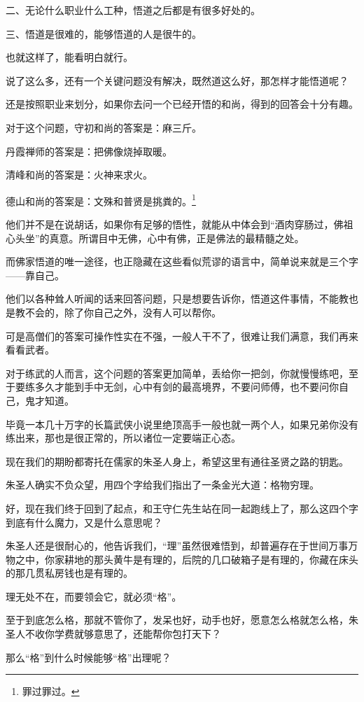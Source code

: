 \begin{multicols}{\theparacolNo}
二、无论什么职业什么工种，悟道之后都是有很多好处的。

三、悟道是很难的，能够悟道的人是很牛的。

也就这样了，能看明白就行。

说了这么多，还有一个关键问题没有解决，既然道这么好，那怎样才能悟道呢？

还是按照职业来划分，如果你去问一个已经开悟的和尚，得到的回答会十分有趣。

对于这个问题，守初和尚的答案是：麻三斤。

丹霞禅师的答案是：把佛像烧掉取暖。

清峰和尚的答案是：火神来求火。

德山和尚的答案是：文殊和普贤是挑粪的。\footnote{罪过罪过。}

他们并不是在说胡话，如果你有足够的悟性，就能从中体会到“酒肉穿肠过，佛祖心头坐”的真意。所谓目中无佛，心中有佛，正是佛法的最精髓之处。

而佛家悟道的唯一途径，也正隐藏在这些看似荒谬的语言中，简单说来就是三个字——靠自己。

他们以各种耸人听闻的话来回答问题，只是想要告诉你，悟道这件事情，不能教也是教不会的，除了你自己之外，没有人可以帮你。

可是高僧们的答案可操作性实在不强，一般人干不了，很难让我们满意，我们再来看看武者。

对于练武的人而言，这个问题的答案更加简单，丢给你一把剑，你就慢慢练吧，至于要练多久才能到手中无剑，心中有剑的最高境界，不要问师傅，也不要问你自己，鬼才知道。

毕竟一本几十万字的长篇武侠小说里绝顶高手一般也就一两个人，如果兄弟你没有练出来，那也是很正常的，所以诸位一定要端正心态。

现在我们的期盼都寄托在儒家的朱圣人身上，希望这里有通往圣贤之路的钥匙。

朱圣人确实不负众望，用四个字给我们指出了一条金光大道：格物穷理。

好，现在我们终于回到了起点，和王守仁先生站在同一起跑线上了，那么这四个字到底有什么魔力，又是什么意思呢？

朱圣人还是很耐心的，他告诉我们，“理”虽然很难悟到，却普遍存在于世间万事万物之中，你家耕地的那头黄牛是有理的，后院的几口破箱子是有理的，你藏在床头的那几贯私房钱也是有理的。

理无处不在，而要领会它，就必须“格”。

至于到底怎么格，那就不管你了，发呆也好，动手也好，愿意怎么格就怎么格，朱圣人不收你学费就够意思了，还能帮你包打天下？

那么“格”到什么时候能够“格”出理呢？


\end{multicols}
